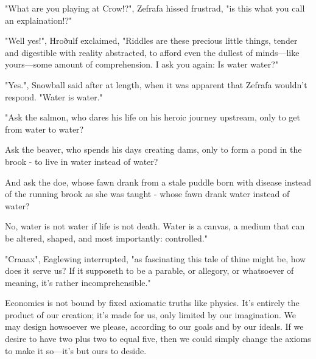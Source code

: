 "What are you playing at Crow!?", Zefrafa hissed frustrad, "is this what you call an explaination!?"

"Well yes!", Hroðulf exclaimed, "Riddles are these precious little things, tender and digestible with reality abstracted, to afford even the dullest of minds---like yours---some amount of comprehension. I ask you again: Is water water?"

"Yes.", Snowball said after at length, when it was apparent that Zefrafa wouldn't respond. "Water is water."

"Ask the salmon, who dares his life on his heroic journey upstream, only to get from water to water?

Ask the beaver, who spends his days creating dams, only to form a pond in the brook - to live in water instead of water?

And ask the doe, whose fawn drank from a stale puddle born with disease instead of the running brook as she was taught - whose fawn drank water instead of water?

No, water is not water if life is not death. Water is a canvas, a medium that can be altered, shaped, and most importantly: controlled."

"Craaax", Eaglewing interrupted, "as fascinating this tale of thine might be, how does it serve us? If it supposeth to be a parable, or allegory, or whatsoever of meaning, it's rather incomprehensible."



Economics is not bound by fixed axiomatic truths like physics. It's entirely the product of our creation; it's made for us, only limited by our imagination. We may design howsoever we please, according to our goals and by our ideals. If we desire to have two plus two to equal five, then we could simply change the axioms to make it so---it's but ours to deside.



